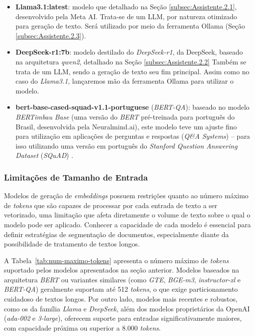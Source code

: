 \begin{itemize}
    \item \textbf{Llama3.1:latest}: modelo que detalhado na Seção \ref{subsec:Assistente.2.1}, desenvolvido pela Meta AI. Trata-se de um \ac{LLM}, por natureza otimizado para geração de texto. Será utilizado por meio da ferramenta Ollama (Seção \ref{subsec:Assistente.2.3}).
    \item \textbf{DeepSeek-r1:7b}: modelo destilado do \textit{DeepSeek-r1}, da DeepSeek, baseado na arquitetura \textit{qwen2}, detalhado na Seção \ref{subsec:Assistente.2.2} Também se trata de um \ac{LLM}, sendo a geração de texto seu fim principal. Assim como no caso do \textit{Llama3.1}, lançaremos mão da ferramenta Ollama para utilizar o modelo.
    \item \textbf{bert-base-cased-squad-v1.1-portuguese} (\textit{BERT-QA}): baseado no modelo \textit{BERTimbau Base} (uma versão do \textit{BERT} pré-treinada para português do Brasil, desenvolvida pela Neuralmind.ai), este modelo teve um ajuste fino para utilização em aplicações de perguntas e respostas (\textit{Q\&A Systems}) -- para isso utilizando uma versão em português do \textit{Stanford Question Answering Dataset} (\textit{SQuAD}) \cite{BERT_QA:1}.
\end{itemize}

\subsubsection{Limitações de Tamanho de Entrada}
\label{subsubsec:Metodologia.2.1.7}

Modelos de geração de \textit{embeddings} possuem restrições quanto ao número máximo de \textit{tokens} que são capazes de processar por cada entrada de texto a ser vetorizado, uma limitação que afeta diretamente o volume de texto sobre o qual o modelo pode ser aplicado. Conhecer a capacidade de cada modelo é essencial para definir estratégias de segmentação de documentos, especialmente diante da possibilidade de tratamento de textos longos.

A Tabela~\ref{tab:num-maximo-tokens} apresenta o número máximo de \textit{tokens} suportado pelos modelos apresentados na seção anterior. Modelos baseados na arquitetura \textit{BERT} ou variantes similares (como \textit{GTE}, \textit{BGE-m3}, \textit{instructor-xl} e \textit{BERT-QA}) geralmente suportam até 512 \textit{tokens}, o que exige particionamento cuidadoso de textos longos. Por outro lado, modelos mais recentes e robustos, como os da família \textit{Llama} e \textit{DeepSeek}, além dos modelos proprietários da OpenAI (\textit{ada-002} e \textit{3-large}), oferecem suporte para entradas significativamente maiores, com capacidade próxima ou superior a 8.000 \textit{tokens}.

